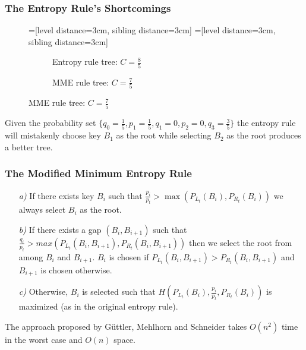 \documentclass{beamer}
\theoremstyle{plain}
\begin{document}
\begin{frame} \frametitle{The Entropy Rule's Shortcomings}

\begin{figure}[H]
\centering
=[level distance=3cm, sibling distance=3cm]
=[level distance=3cm, sibling distance=3cm]
\scriptsize
\begin{subfigure}{.46\textwidth}
\centering
{}
\caption{Entropy rule tree: $C=\frac{8}{5}$}
\end{subfigure}
\begin{subfigure}{.46\textwidth}
\centering
{}
\caption{MME rule tree: $C=\frac{7}{5}$}
\end{subfigure}
\end{figure}

Given the probability set $\{q_0 = \frac{1}{5}, p_1 = \frac{1}{5}, q_1 = 0, p_2 = 0, q_3 = \frac{3}{5}\}$ the entropy rule will mistakenly choose key $B_1$ as the root while selecting $B_2$ as the root produces a better tree.

\end{frame}

\begin{frame} \frametitle{The Modified Minimum Entropy Rule}

\begin{itemize}
\item[\textit{a)}] If there exists key $B_i$ such that $\frac{p_i}{p_t} > \max(P_{L_t}(B_i), P_{R_t}(B_i))$ we always select $B_i$ as the root.

\item[\textit{b)}] If there exists a gap $(B_i, B_{i+1})$ such that $\frac{q_i}{p_t} > max(P_{L_t}(B_i, B_{i+1}), P_{R_t}(B_i, B_{i+1}))$ then we select the root from among $B_i$ and $B_{i+1}$. $B_i$ is chosen if $P_{L_t}(B_i, B_{i+1}) > P_{R_t}(B_i, B_{i+1})$ and $B_{i+1}$ is chosen otherwise.

\item[\textit{c)}] Otherwise, $B_i$ is selected such that $H(P_{L_t}(B_i), \frac{p_i}{p_t}, P_{R_t}(B_i))$ is maximized (as in the original entropy rule).

\end{itemize}
The approach proposed by G{\"u}ttler, Mehlhorn and Schneider takes $O(n^2)$ time in the worst case and $O(n)$ space.
\end{frame}
\end{document}
